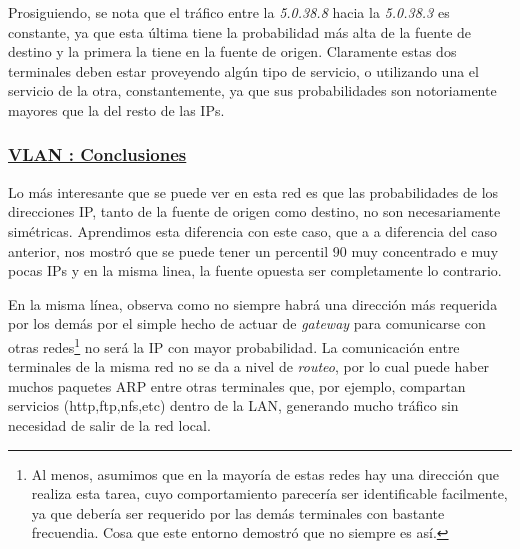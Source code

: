 \par Prosiguiendo, se nota que el tr\'afico entre la \textit{5.0.38.8} hacia
la \textit{5.0.38.3} es constante, ya que esta \'ultima tiene la probabilidad
m\'as alta de la fuente de destino y la primera la tiene en la fuente de origen. Claramente
estas dos terminales deben estar proveyendo alg\'un tipo de servicio, o utilizando
una el servicio de la otra, constantemente, ya que sus probabilidades son
notoriamente mayores que la del resto de las IPs.


\subsubsection*{\underline{VLAN : Conclusiones}}\label{subsubsec:vlan20_conclusiones}
\par Lo m\'as interesante que se puede ver en esta red es que las probabilidades
de los direcciones IP, tanto de la fuente de origen como destino, no son
necesariamente sim\'etricas. Aprendimos esta diferencia con este caso, que a
a diferencia del caso anterior, nos mostr\'o que se puede tener un percentil 90
muy concentrado e muy pocas IPs y en la misma linea, la fuente opuesta ser
completamente lo contrario.

\par En la misma l\'inea, observa como no siempre habr\'a una direcci\'on
m\'as requerida por los dem\'as por el simple hecho de actuar de \textit{gateway}
para comunicarse con otras redes\footnote{Al menos, asumimos que en la mayor\'ia
de estas redes hay una direcci\'on que realiza esta tarea, cuyo comportamiento
parecer\'ia ser identificable facilmente, ya que deber\'ia ser requerido por
las dem\'as terminales con bastante frecuendia. Cosa que este entorno demostr\'o
que no siempre es as\'i.} no ser\'a la IP con mayor probabilidad. La comunicaci\'on
entre terminales de la misma red no se da a nivel de \textit{routeo}, por lo
cual puede haber muchos paquetes ARP entre otras terminales que, por ejemplo,
compartan servicios (http,ftp,nfs,etc) dentro de la LAN, generando mucho
tr\'afico sin necesidad de salir de la red local.
